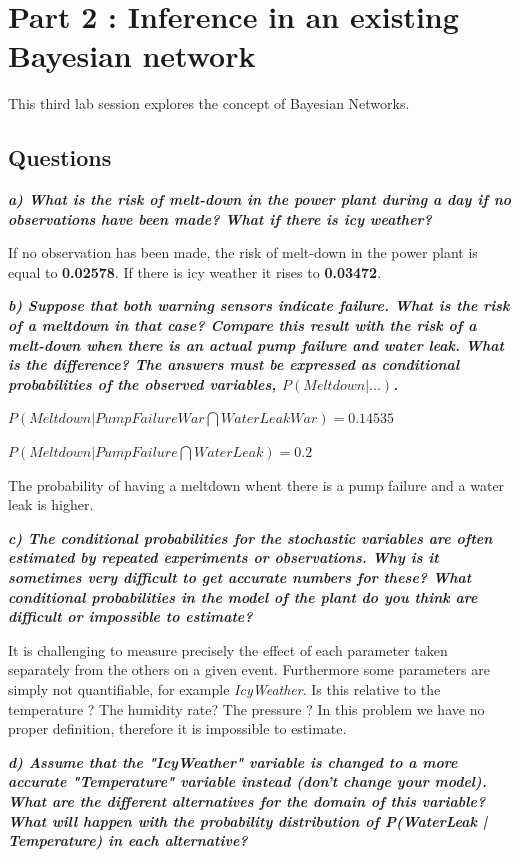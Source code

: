   \section*{Part 2 : Inference in an existing Bayesian network}
 \thispagestyle{empty}

This third lab session explores the concept of Bayesian Networks.

\subsection*{Questions}


\textit{\textbf{a) What is the risk of melt-down in the power plant during a day if no
observations have been made? What if there is icy weather?}}

If no observation has been made, the risk of melt-down in the power plant is
equal to \textbf{0.02578}. If there is icy weather it rises to \textbf{0.03472}.

\textit{\textbf{b) Suppose that both warning sensors indicate failure. What is the risk
of a meltdown in that case? Compare this result with the risk of a melt-down
when there is an actual pump failure and water leak. What is the difference?
The answers must be expressed as conditional probabilities of the observed
variables, $P(Meltdown|...)$.}}

$P(Meltdown| PumpFailureWar \bigcap WaterLeakWar) = 0.14535$

$P(Meltdown| PumpFailure \bigcap WaterLeak) = 0.2$

The probability of having a meltdown whent there is a pump failure and a water
leak is higher.

\textit{\textbf{c) The conditional probabilities for the stochastic variables are often
estimated by repeated experiments or observations. Why is it sometimes very
difficult to get accurate numbers for these? What conditional probabilities
in the model of the plant do you think are difficult or impossible to estimate?}}

It is challenging to measure precisely the effect of each parameter taken separately
from the others on a given event. Furthermore some parameters are simply not
quantifiable, for example \textit{IcyWeather}. Is this relative to the temperature ?
The humidity rate? The pressure ? In this problem we have no proper definition,
therefore it is impossible to estimate.

\textit{\textbf{d) Assume that the "IcyWeather" variable is changed to a more accurate
"Temperature" variable instead (don't change your model). What are the different
 alternatives for the domain of this variable? What will happen with the
 probability distribution of P(WaterLeak | Temperature) in each alternative? }}

